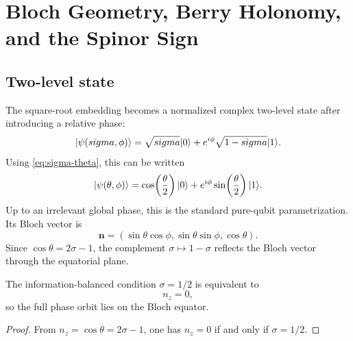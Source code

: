 \chapter{Bloch Geometry, Berry Holonomy, and the Spinor Sign}
\label{ch:bloch}

\section{Two-level state}
The square-root embedding becomes a normalized complex two-level state after introducing a relative phase:
\begin{equation}
\lvert \psi(sigma,\phi)\rangle
=\sqrt{sigma}\lvert 0\rangle
+e^{i\phi}\sqrt{1-sigma}\lvert 1\rangle.
\label{eq:qubit-state}
\end{equation}
Using \eqref{eq:sigma-theta}, this can be written
\begin{equation}
\lvert \psi(\theta,\phi)\rangle
=\cos\!\left(\frac\theta2\right)\lvert 0\rangle
+e^{i\phi}\sin\!\left(\frac\theta2\right)\lvert 1\rangle.
\end{equation}
Up to an irrelevant global phase, this is the standard pure-qubit parametrization. Its Bloch vector is
\begin{equation}
\boldsymbol{n}=(\sin\theta\cos\phi,\sin\theta\sin\phi,\cos\theta).
\end{equation}
Since $\cos\theta=2\sigma-1$, the complement $\sigma\mapsto1-\sigma$ reflects the Bloch vector through the equatorial plane.

\begin{proposition}
The information-balanced condition $\sigma=1/2$ is equivalent to
\begin{equation}
n_z=0,
\end{equation}
so the full phase orbit lies on the Bloch equator.
\end{proposition}

\begin{proof}
From $n_z=\cos\theta=2\sigma-1$, one has $n_z=0$ if and only if $\sigma=1/2$.
\end{proof}

